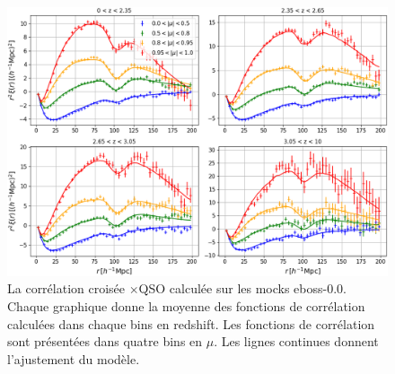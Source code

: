 \begin{figure}
  \centering
  \includegraphics[scale=0.4]{xcf_eboss00_4bins}
  \caption{La corrélation croisée \lya{}$\times$QSO calculée sur les mocks eboss-0.0. Chaque graphique donne la moyenne des fonctions de corrélation calculées dans chaque bins en redshift. Les fonctions de corrélation sont présentées dans quatre bins en $\mu$. Les lignes continues donnent l'ajustement du modèle.}
  \label{fig:xcf_eboss00_4bins}
\end{figure}


